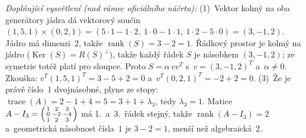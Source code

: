 \medskip
\noindent\textit{Doplňující vysvětlení (nad rámec oficiálního náčrtu):} (1)~Vektor kolmý na oba generátory jádra dá vektorový součin $(1,5,1)\times(0,2,1)=(5\cdot1-1\cdot2,\ 1\cdot0-1\cdot1,\ 1\cdot2-5\cdot0)=(3,-1,2)$. Jádro má dimenzi~$2$, takže $\operatorname{rank}(S)=3-2=1$. Řádkový prostor je kolmý na jádro ($\operatorname{Ker}(S)=R(S)^\perp$), takže každý řádek $S$ je násobkem $(3,-1,2)$; ze symetrie totéž platí pro sloupce. Proto $S=\alpha\,v v^T$ s~$v=(3,-1,2)^T$ a~$\alpha\neq0$. Zkouška: $v^T(1,5,1)^T=3-5+2=0$ a~$v^T(0,2,1)^T=-2+2=0$. (3)~Že je právě číslo~$1$ dvojnásobné, plyne ze stopy: $\operatorname{trace}(A)=2-1+4=5=3+1+\lambda_3$, tedy $\lambda_3=1$. Matice $A-I_3=\begin{psmallmatrix}1&2&3\\0&-2&-4\\1&2&3\end{psmallmatrix}$ má 1.\ a~3.\ řádek stejný, takže $\operatorname{rank}(A-I_3)=2$ a~geometrická násobnost čísla~$1$ je $3-2=1$, menší než algebraická~$2$.
